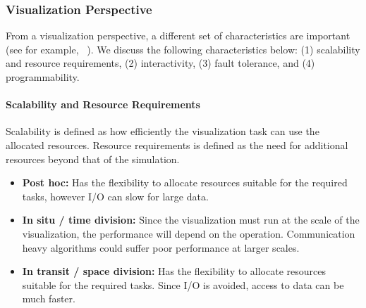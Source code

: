 \documentclass[x11names,table,xcdraw,graybox]{svmult}
\begin{document}

\subsubsection{Visualization Perspective}
From a visualization perspective, a different set of characteristics are important (see for example, ~\cite{Kress-isav15}).
We discuss the following characteristics below: (1) scalability and resource requirements, (2) interactivity, (3) fault tolerance, and (4) programmability.

\paragraph{\textbf{Scalability and Resource Requirements}}
Scalability is defined as how efficiently the visualization task can use the allocated resources.
Resource requirements is defined as the need for additional resources beyond that of the simulation.
\begin{itemize}
    \item \textbf{Post hoc:} Has the flexibility to allocate resources suitable for the required tasks, however I/O can slow for large data.
    \item \textbf{In situ / time division:} Since the visualization must run at the scale of the visualization, the performance will depend on the operation. Communication heavy algorithms could suffer poor performance at larger scales.
    \item \textbf{In transit / space division:} Has the flexibility to allocate resources suitable for the required tasks. Since I/O is avoided, access to data can be much faster.
\end{itemize}
\end{document}
